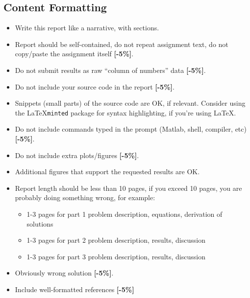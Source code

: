 \documentclass{article}
\begin{document}
\subsection{Content Formatting}
        \begin{itemize}
	\item Write this report like a narrative, with sections.
        \item    Report should be self-contained, do not repeat assignment text, do not 
                copy/paste the assignment itself  {\color{red}\textbf{[-5\%]}}.
        \item    Do not submit results as raw ``column of numbers'' data  {\color{red}\textbf{[-5\%]}}.
        \item    Do not include your source code in the report  {\color{red}\textbf{[-5\%]}}.
        \item    Snippets (small parts) of the source code are OK, if relevant. 
                Consider using the \LaTeX \texttt{minted} package for syntax highlighting, if 
                you're using \LaTeX.
        \item    Do not include commands typed in the prompt (Matlab, shell, compiler, etc) 
                 {\color{red}\textbf{[-5\%]}}.
        \item    Do not include extra plots/figures  {\color{red}\textbf{[-5\%]}}.
        \item    Additional figures that support the requested results are OK.
        \item   Report length should be less than 10 pages, if you exceed 10 pages, 
                you are probably doing something wrong, for example:
                \begin{itemize}
                        \item  1-3 pages for part 1 problem description, equations, derivation of solutions
                        \item  1-3 pages for part 2 problem description, results, discussion
                        \item  1-3 pages for part 3 problem description, results, discussion
                \end{itemize}
        \item    Obviously wrong solution  {\color{red}\textbf{[-5\%]}}.
        \item    Include well-formatted references  {\color{red}\textbf{[-5\%]}} 
\end{itemize}
\end{document}
